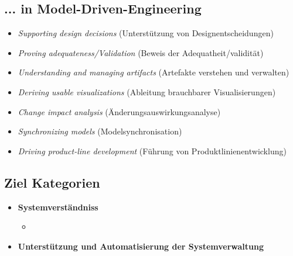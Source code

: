 \subsection{... in Model-Driven-Engineering}
\begin{itemize}

\item
\textit{Supporting design decisions}
(Unterstützung von Designentscheidungen)
\item
\textit{Proving adequateness/Validation}
(Beweis der Adequatheit/validität)
\item
\textit{Understanding and managing artifacts}
(Artefakte verstehen und verwalten)
\item
\textit{Deriving usable visualizations}
(Ableitung brauchbarer Visualisierungen)
\item
\textit{Change impact analysis}
(Änderungsauswirkungsanalyse)
\item
\textit{Synchronizing models}
(Modelsynchronisation)
\item
\textit{Driving product-line development}
(Führung von Produktlinienentwicklung)

\end{itemize}


\subsection{Ziel Kategorien}
\begin{itemize}

\item
\textbf{Systemverständniss}
\begin{itemize}
\item
\end{itemize}

\item
\textbf{Unterstützung und Automatisierung der Systemverwaltung}

\end{itemize}
